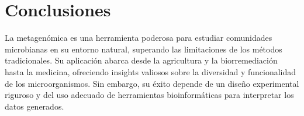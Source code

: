 \section{Conclusiones}
La metagenómica es una herramienta poderosa para estudiar comunidades microbianas en su entorno natural, superando las limitaciones de los métodos tradicionales. Su aplicación abarca desde la agricultura y la biorremediación hasta la medicina, ofreciendo insights valiosos sobre la diversidad y funcionalidad de los microorganismos. Sin embargo, su éxito depende de un diseño experimental riguroso y del uso adecuado de herramientas bioinformáticas para interpretar los datos generados.
